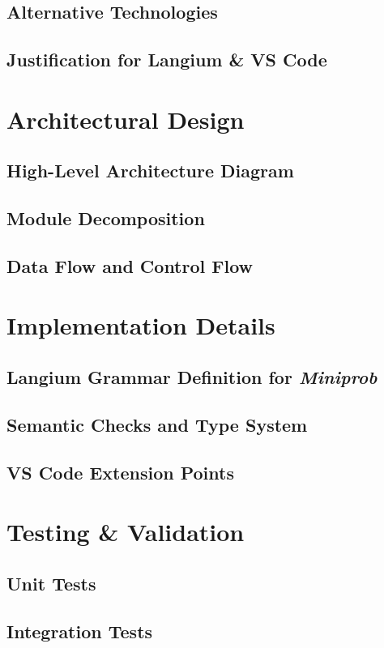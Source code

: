 \documentclass[11pt]{report}
\begin{document}
\section{Alternative Technologies}
\section{Justification for Langium \& VS Code}

\chapter{Architectural Design}
\section{High-Level Architecture Diagram}
\section{Module Decomposition}
\section{Data Flow and Control Flow}

\chapter{Implementation Details}
\label{sec:langium-grammar}
\section{Langium Grammar Definition for \textit{Miniprob}}
\section{Semantic Checks and Type System}
\section{VS Code Extension Points}

\chapter{Testing \& Validation}
\section{Unit Tests}
\section{Integration Tests}
\end{document}
